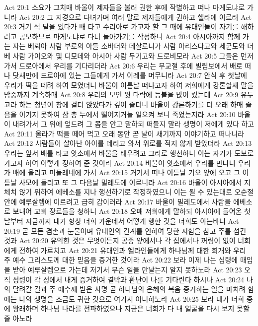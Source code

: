 Act 20:1  소요가 그치매 바울이 제자들을 불러 권한 후에 작별하고 떠나 마게도냐로 가니라
Act 20:2  그 지경으로 다녀가며 여러 말로 제자들에게 권하고 헬라에 이르러
Act 20:3  거기 석 달을 있다가 배 타고 수리아로 가고자 할 그 때에 유대인들이 자기를 해하려고 공모하므로 마게도냐로 다녀 돌아가기를 작정하니
Act 20:4  아시아까지 함께 가는 자는 베뢰아 사람 부로의 아들 소바더와 데살로니가 사람 아리스다고와 세군도와 더베 사람 가이오와 및 디모데와 아시아 사람 두기고와 드로비모라
Act 20:5  그들은 먼저 가서 드로아에서 우리를 기다리더라
Act 20:6  우리는 무교절 후에 빌립보에서 배로 떠나 닷새만에 드로아에 있는 그들에게 가서 이레를 머무니라
Act 20:7  안식 후 첫날에 우리가 떡을 떼려 하여 모였더니 바울이 이튿날 떠나고자 하여 저희에게 강론할새 말을 밤중까지 계속하매
Act 20:8  우리의 모인 윗 다락에 등불을 많이 켰는데
Act 20:9  유두고라 하는 청년이 창에 걸터 앉았다가 깊이 졸더니 바울이 강론하기를 더 오래 하매 졸음을 이기지 못하여 삼 층 누에서 떨어지거늘 일으켜 보니 죽었는지라
Act 20:10  바울이 내려가서 그 위에 엎드려 그 몸을 안고 말하되 떠들지 말라 생명이 저에게 있다 하고
Act 20:11  올라가 떡을 떼어 먹고 오래 동안 곧 날이 새기까지 이야기하고 떠나니라
Act 20:12  사람들이 살아난 아이를 데리고 와서 위로를 적지 않게 받았더라
Act 20:13  우리는 앞서 배를 타고 앗소에서 바울을 태우려고 그리로 행선하니 이는 자기가 도보로 가고자 하여 이렇게 정하여 준 것이라
Act 20:14  바울이 앗소에서 우리를 만나니 우리가 배에 올리고 미둘레네에 가서
Act 20:15  거기서 떠나 이튿날 기오 앞에 오고 그 이튿날 사모에 들리고 또 그 다음날 밀레도에 이르니라
Act 20:16  바울이 아시아에서 지체치 않기 위하여 에베소를 지나 행선하기로 작정하였으니 이는 될 수 있는대로 오순절 안에 예루살렘에 이르려고 급히 감이러라
Act 20:17  바울이 밀레도에서 사람을 에베소로 보내어 교회 장로들을 청하니
Act 20:18  오매 저희에게 말하되 아시아에 들어온 첫날부터 지금까지 내가 항상 너희 가운데서 어떻게 행한 것을 너희도 아는바니
Act 20:19  곧 모든 겸손과 눈물이며 유대인의 간계를 인하여 당한 시험을 참고 주를 섬긴 것과
Act 20:20  유익한 것은 무엇이든지 공중 앞에서나 각 집에서나 꺼림이 없이 너희에게 전하여 가르치고
Act 20:21  유대인과 헬라인들에게 하나님께 대한 회개와 우리 주 예수 그리스도께 대한 믿음을 증거한 것이라
Act 20:22  보라 이제 나는 심령에 매임을 받아 예루살렘으로 가는데 저기서 무슨 일을 만날는지 알지 못하노라
Act 20:23  오직 성령이 각 성에서 내게 증거하여 결박과 환난이 나를 기다린다 하시나
Act 20:24  나의 달려갈 길과 주 예수께 받은 사명 곧 하나님의 은혜의 복음 증거하는 일을 마치려 함에는 나의 생명을 조금도 귀한 것으로 여기지 아니하노라
Act 20:25  보라 내가 너희 중에 왕래하며 하나님 나라를 전파하였으나 지금은 너희가 다 내 얼굴을 다시 보지 못할줄 아노라
